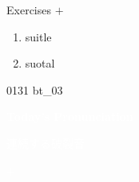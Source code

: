 \documentclass[aspectratio=169,xcolor={dvipsnames,table}]{beamer}
\begin{document}
\begin{frame}[plain]{Exercises  $+$ }
  \Large
  \begin{enumerate}
    \item<2-> suitle
    \item<4-> suotal
  \end{enumerate}

  \hfill{\tiny 0131}\,{\scriptsize {}\,bt\_03}

\end{frame}
\begin{frame}

  \hypertarget{today}{}
  \centering
  \textcolor{white}{\Huge\bfseries Today's Pronunciation}

  \vspace{30pt}

  \textcolor{white}{\Large 連続する破裂音}

  \textcolor{white}{\Large {} $+$ }
\end{frame}
\end{document}
